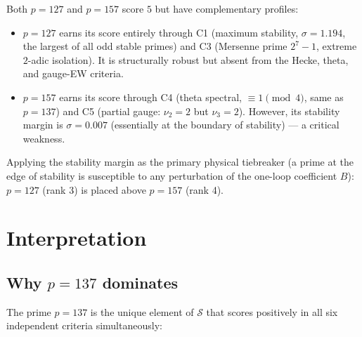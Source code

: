 \documentclass[12pt,a4paper]{article}
\theoremstyle{definition}
\theoremstyle{remark}
\begin{document}
Both $p = 127$ and $p = 157$ score $5$ but have complementary profiles:
\begin{itemize}
  \item $p = 127$ earns its score entirely through C1 (maximum stability,
        $\sigma = 1.194$, the largest of all odd stable primes) and C3
        (Mersenne prime $2^7 - 1$, extreme $2$-adic isolation).
        It is structurally robust but absent from the Hecke, theta, and
        gauge-EW criteria.
  \item $p = 157$ earns its score through C4 (theta spectral, $\equiv 1
        \pmod{4}$, same as $p = 137$) and C5 (partial gauge: $\nu_2 = 2$
        but $\nu_3 = 2$).  However, its stability margin is $\sigma = 0.007$
        (essentially at the boundary of stability) — a critical weakness.
\end{itemize}

Applying the stability margin as the primary physical tiebreaker (a prime
at the edge of stability is susceptible to any perturbation of the
one-loop coefficient $B$): $p = 127$ (rank 3) is placed above $p = 157$
(rank 4).

\section{Interpretation}
\label{sec:spr:interpretation}

\subsection{Why $p = 137$ dominates}

The prime $p = 137$ is the unique element of $\mathcal{S}$ that scores
positively in all six independent criteria simultaneously:
\end{document}
